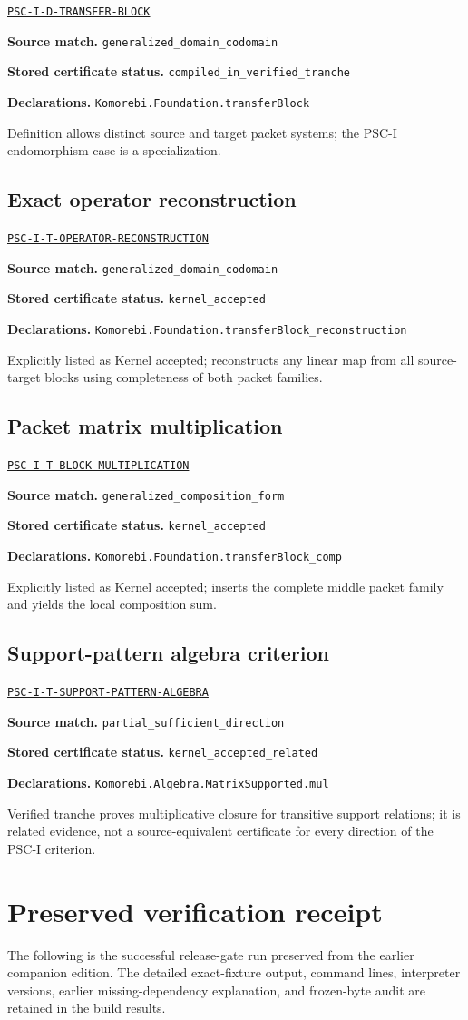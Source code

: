 \documentclass[a4paper,11pt]{article}
\newcommand{\field}[2]{\par\smallskip\noindent\textbf{#1.} #2\par}
\begin{document}
\hyperref[rec:PSC-I-D-TRANSFER-BLOCK]{\nolinkurl{PSC-I-D-TRANSFER-BLOCK}}
\field{Source match}{\nolinkurl{generalized_domain_codomain}}
\field{Stored certificate status}{\nolinkurl{compiled_in_verified_tranche}}
\field{Declarations}{\nolinkurl{Komorebi.Foundation.transferBlock}}
Definition allows distinct source and target packet systems; the PSC-I endomorphism case is a specialization.
\subsection*{Exact operator reconstruction}
\hyperref[rec:PSC-I-T-OPERATOR-RECONSTRUCTION]{\nolinkurl{PSC-I-T-OPERATOR-RECONSTRUCTION}}
\field{Source match}{\nolinkurl{generalized_domain_codomain}}
\field{Stored certificate status}{\nolinkurl{kernel_accepted}}
\field{Declarations}{\nolinkurl{Komorebi.Foundation.transferBlock_reconstruction}}
Explicitly listed as Kernel accepted; reconstructs any linear map from all source-target blocks using completeness of both packet families.
\subsection*{Packet matrix multiplication}
\hyperref[rec:PSC-I-T-BLOCK-MULTIPLICATION]{\nolinkurl{PSC-I-T-BLOCK-MULTIPLICATION}}
\field{Source match}{\nolinkurl{generalized_composition_form}}
\field{Stored certificate status}{\nolinkurl{kernel_accepted}}
\field{Declarations}{\nolinkurl{Komorebi.Foundation.transferBlock_comp}}
Explicitly listed as Kernel accepted; inserts the complete middle packet family and yields the local composition sum.
\subsection*{Support-pattern algebra criterion}
\hyperref[rec:PSC-I-T-SUPPORT-PATTERN-ALGEBRA]{\nolinkurl{PSC-I-T-SUPPORT-PATTERN-ALGEBRA}}
\field{Source match}{\nolinkurl{partial_sufficient_direction}}
\field{Stored certificate status}{\nolinkurl{kernel_accepted_related}}
\field{Declarations}{\nolinkurl{Komorebi.Algebra.MatrixSupported.mul}}
Verified tranche proves multiplicative closure for transitive support relations; it is related evidence, not a source-equivalent certificate for every direction of the PSC-I criterion.
\clearpage\section{Preserved verification receipt}
The following is the successful release-gate run preserved from the earlier companion edition. The detailed exact-fixture output, command lines, interpreter versions, earlier missing-dependency explanation, and frozen-byte audit are retained in the build results.
\end{document}

